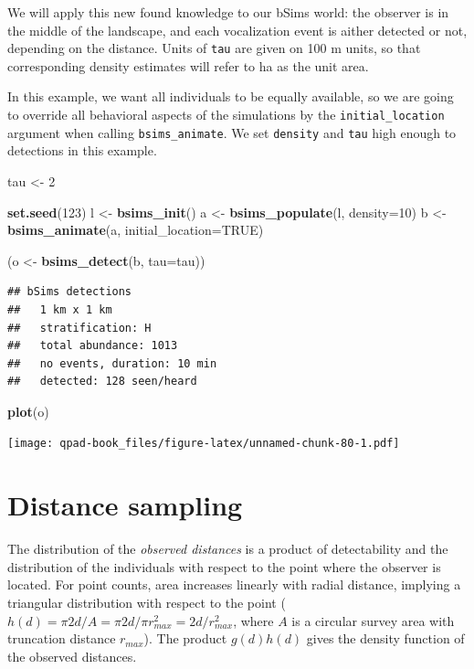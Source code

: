 \documentclass[12pt,]{book}
\newenvironment{Shaded}{\begin{snugshade}}{\end{snugshade}}
\newcommand{\DataTypeTok}[1]{\textcolor[rgb]{0.13,0.29,0.53}{#1}}
\newcommand{\DecValTok}[1]{\textcolor[rgb]{0.00,0.00,0.81}{#1}}
\newcommand{\KeywordTok}[1]{\textcolor[rgb]{0.13,0.29,0.53}{\textbf{#1}}}
\newcommand{\NormalTok}[1]{#1}
\newcommand{\OtherTok}[1]{\textcolor[rgb]{0.56,0.35,0.01}{#1}}
\newcommand{\StringTok}[1]{\textcolor[rgb]{0.31,0.60,0.02}{#1}}
\begin{document}
We will apply this new found knowledge to our bSims world:
the observer is in the middle of the landscape, and each vocalization
event is aither detected or not, depending on the distance.
Units of \texttt{tau} are given on 100 m units, so that corresponding
density estimates will refer to ha as the unit area.

In this example, we want all individuals to be equally available,
so we are going to override all behavioral aspects of the simulations
by the \texttt{initial\_location} argument when calling \texttt{bsims\_animate}.
We set \texttt{density} and \texttt{tau} high enough to detections in this example.

\begin{Shaded}
\begin{Highlighting}[]
\NormalTok{tau <-}\StringTok{ }\DecValTok{2}

\KeywordTok{set.seed}\NormalTok{(}\DecValTok{123}\NormalTok{)}
\NormalTok{l <-}\StringTok{ }\KeywordTok{bsims_init}\NormalTok{()}
\NormalTok{a <-}\StringTok{ }\KeywordTok{bsims_populate}\NormalTok{(l, }\DataTypeTok{density=}\DecValTok{10}\NormalTok{)}
\NormalTok{b <-}\StringTok{ }\KeywordTok{bsims_animate}\NormalTok{(a, }\DataTypeTok{initial_location=}\OtherTok{TRUE}\NormalTok{)}

\NormalTok{(o <-}\StringTok{ }\KeywordTok{bsims_detect}\NormalTok{(b, }\DataTypeTok{tau=}\NormalTok{tau))}
\end{Highlighting}
\end{Shaded}

\begin{verbatim}
## bSims detections
##   1 km x 1 km
##   stratification: H
##   total abundance: 1013
##   no events, duration: 10 min
##   detected: 128 seen/heard
\end{verbatim}

\begin{Shaded}
\begin{Highlighting}[]
\KeywordTok{plot}\NormalTok{(o)}
\end{Highlighting}
\end{Shaded}

\texttt{[image: qpad-book\_files/figure-latex/unnamed-chunk-80-1.pdf]}

\hypertarget{distance-sampling}{%
\section{Distance sampling}\label{distance-sampling}}

The distribution of the \emph{observed distances} is a product of detectability
and the distribution of the individuals with respect to the point where
the observer is located.
For point counts, area increases linearly with radial distance,
implying a triangular distribution with respect to the point
(\(h(d)=\pi 2 d /A=\pi 2 d / \pi r_{max}^2=2 d / r_{max}^2\), where
\(A\) is a circular survey area with truncation distance \(r_{max}\)).
The product \(g(d) h(d)\) gives the density function of the observed distances.
\end{document}
